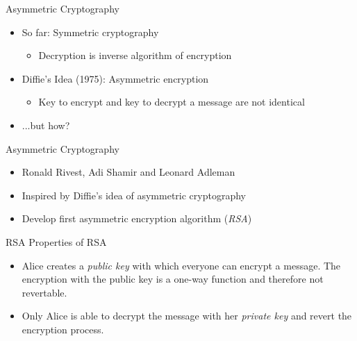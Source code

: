 \documentclass[]{beamer}
\begin{document}
\begin{frame}{Asymmetric Cryptography}
	\begin{itemize}
		\item<1-> So far: Symmetric cryptography
		\begin{itemize}
			\item<1->Decryption is inverse algorithm of encryption
		\end{itemize}
		\item<2-> Diffie's Idea (1975): Asymmetric encryption
		\begin{itemize}
			\item<2->Key to encrypt and key to decrypt a message are not identical
		\end{itemize}
		\item<3->...but how?
	\end{itemize}
\end{frame}

\begin{frame}{Asymmetric Cryptography}
	\begin{itemize}
		\item<1-> Ronald Rivest, Adi Shamir and Leonard Adleman
		\item<2-> Inspired by Diffie's idea of asymmetric cryptography
		\item<3-> Develop first asymmetric encryption algorithm (\textit{RSA}) \cite{rivest1978}
	\end{itemize}
\end{frame}

\begin{frame}{RSA}
	Properties of RSA
	\begin{itemize}
		\item<1->[(a)] Alice creates a \textit{public key} with which everyone can encrypt a message. The encryption with the public key is a one-way function and therefore not revertable.
		\item<2->[(b)] Only Alice is able to decrypt the message with her \textit{private key} and revert the encryption process.
	\end{itemize}
\end{frame}
\end{document}
